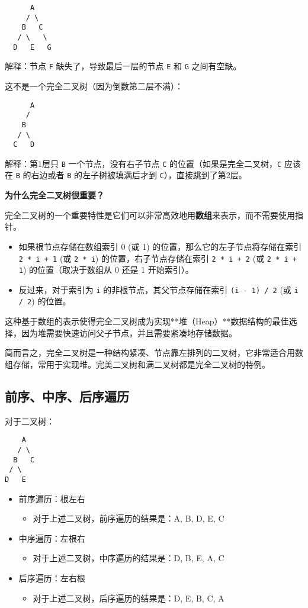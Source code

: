 \begin{lstlisting}
      A
     / \
    B   C
   / \   \
  D   E   G
\end{lstlisting}
解释：节点 \lstinline{F} 缺失了，导致最后一层的节点 \lstinline{E} 和 \lstinline{G} 之间有空缺。

这不是一个完全二叉树（因为倒数第二层不满）：

\begin{lstlisting}
      A
     /
    B
   / \
  C   D
\end{lstlisting}
解释：第1层只 \lstinline{B} 一个节点，没有右子节点 \lstinline{C} 的位置（如果是完全二叉树，\lstinline{C} 应该在 \lstinline{B} 的右边或者 \lstinline{B} 的左子树被填满后才到 \lstinline{C}），直接跳到了第2层。

\textbf{为什么完全二叉树很重要？}

完全二叉树的一个重要特性是它们可以非常高效地用\textbf{数组}来表示，而不需要使用指针。

\begin{itemize}
	\item 如果根节点存储在数组索引 0 (或 1) 的位置，那么它的左子节点将存储在索引 \lstinline{2 * i + 1} (或 \lstinline{2 * i}) 的位置，右子节点存储在索引 \lstinline{2 * i + 2} (或 \lstinline{2 * i + 1}) 的位置（取决于数组从 0 还是 1 开始索引）。
	\item 反过来，对于索引为 \lstinline{i} 的非根节点，其父节点存储在索引 \lstinline{(i - 1) / 2} (或 \lstinline{i / 2}) 的位置。
\end{itemize}

这种基于数组的表示使得完全二叉树成为实现**堆（Heap）**数据结构的最佳选择，因为堆需要快速访问父子节点，并且需要紧凑地存储数据。

简而言之，完全二叉树是一种结构紧凑、节点靠左排列的二叉树，它非常适合用数组存储，常用于实现堆。完美二叉树和满二叉树都是完全二叉树的特例。

\subsection{前序、中序、后序遍历}

对于二叉树：

\begin{lstlisting}
    A
   / \
  B   C
 / \
D   E
\end{lstlisting}
\begin{itemize}
	\item 前序遍历：根左右
	\begin{itemize}
		\item 对于上述二叉树，前序遍历的结果是：A, B, D, E, C
	\end{itemize}
	\item 中序遍历：左根右
	\begin{itemize}
		\item 对于上述二叉树，中序遍历的结果是：D, B, E, A, C
	\end{itemize}
	\item 后序遍历：左右根
	\begin{itemize}
		\item 对于上述二叉树，后序遍历的结果是：D, E, B, C, A
	\end{itemize}
\end{itemize}

